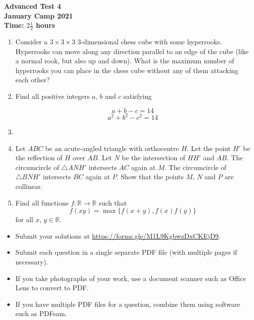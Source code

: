 \documentclass{article}
\begin{document}
\thispagestyle{empty}

\begin{center}
  \textbf{\Large Advanced Test 4}
  \\ \vspace{1em}
  \textbf{\large January Camp 2021}
  \\ \vspace{1em}
  \textbf{\large Time: $2\frac{1}{2}$ hours}
\end{center}

\vspace{12pt}

\begin{enumerate}[1.]

\item %
Consider a $3\times3\times3$ 3-dimensional chess cube with some hyperrooks.
Hyperrooks can move along any direction parallel to an edge of the cube (like a normal rook, but also up and down).
What is the maximum number of hyperrooks you can place in the chess cube without any of them attacking each other?


\item %
Find all positive integers $a$, $b$ and $c$ satisfying 

$$a + b - c = 14 $$
$$a^2 + b^2 - c^2 = 14$$


\item %


\item %
Let $ABC$ be an acute-angled triangle with orthocentre $H$. Let the point $H'$ be the reflection of $H$ over $AB$. Let $N$ be the intersection of $HH'$ and $AB$. The circumcircle of $\triangle ANH'$ intersects $AC$ again at $M$. The circumcircle of $\triangle BNH'$ intersects $BC$ again at $P$. Show that the points $M$, $N$ and $P$ are collinear.

\item %
Find all functions $f: \mathbb{R} \rightarrow \mathbb{R}$ such that 
$$f(xy) = \max\{f(x + y), f(x)f(y)\} $$
for all $x$, $y \in \mathbb{R}$.

\end{enumerate}


\vfill
\begin{itemize}
	\item Submit your solutions at \url{https://forms.gle/M1L9KgbwzDxCKEjD9}.
	\item Submit each question in a single separate PDF file (with multiple pages if necessary).
	\item If you take photographs of your work, use a document scanner such as Office Lens to convert to PDF.
	\item If you have multiple PDF files for a question, combine them using software such as PDFsam.
\end{itemize}
\end{document}
